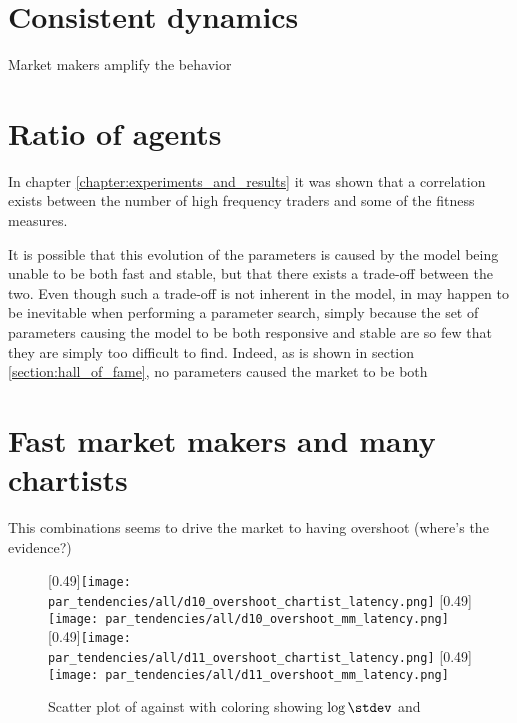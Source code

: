 \section{Consistent dynamics}

Market makers amplify the behavior

\section{Ratio of agents}
In chapter \ref{chapter:experiments_and_results} it was shown that a correlation exists between the number of high frequency traders and some of the fitness measures. 

It is possible that this evolution of the parameters is caused by the model being unable to be both fast and stable, but that there exists a trade-off between the two. Even though such a trade-off is not inherent in the model, in may happen to be inevitable when performing a parameter search, simply because the set of parameters causing the model to be both responsive and stable are so few that they are simply too difficult to find. Indeed, as is shown in section \ref{section:hall_of_fame}, no parameters caused the market to be both 


\section{Fast market makers and many chartists}
This combinations seems to drive the market to having overshoot (where's the evidence?)


\begin{figure}
\centering
{}[0.49\linewidth]{\texttt{[image: par\_tendencies/all/d10\_overshoot\_chartist\_latency.png]}}
[0.49\linewidth]{\texttt{[image: par\_tendencies/all/d10\_overshoot\_mm\_latency.png]}}
[0.49\linewidth]{\texttt{[image: par\_tendencies/all/d11\_overshoot\_chartist\_latency.png]}}
[0.49\linewidth]{\texttt{[image: par\_tendencies/all/d11\_overshoot\_mm\_latency.png]}}
\caption{Scatter plot of \roundstable against \timetoreachnewfundamental with coloring showing $\log \stdev$ and \overshoot}
\label{figure:scatter_fitness_inliers_a}
\end{figure}
\begin{figure}
\centering

\end{figure}

